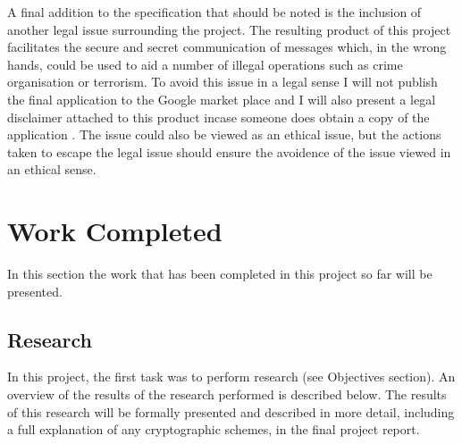 \documentclass[a4paper,11pt]{article}
\begin{document}
A final addition to the specification that should be noted is the inclusion of another legal issue surrounding the project. The resulting product of this project facilitates the secure and secret communication of messages which, in the wrong hands, could be used to aid a number of illegal operations such as crime organisation or terrorism. To avoid this issue in a legal sense I will not publish the final application to the Google market place and I will also present a legal disclaimer attached to this product incase someone does obtain a copy of the application \cite{dataprotect}. The issue could also be viewed as an ethical issue, but the actions taken to escape the legal issue should ensure the avoidence of the issue viewed in an ethical sense. 

\section{Work Completed}

In this section the work that has been completed in this project so far will be presented.

\subsection{Research}

In this project, the first task was to perform research (see Objectives section). An overview of the results of the research performed is described below. The results of this research will be formally presented and described in more detail, including a full explanation of any cryptographic schemes, in the final project report.
\end{document}
